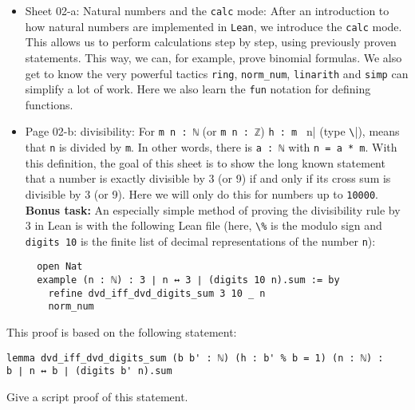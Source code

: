 \documentclass{memoir}
\begin{document}
\begin{itemize}
\item Sheet 02-a: Natural numbers and the \Verb|calc| mode:
    After an introduction to how natural numbers are implemented in \Verb|Lean|, we introduce the \Verb|calc| mode. This allows us to perform calculations step by step, using previously proven statements. This way, we can, for example, prove binomial formulas. We also get to know the very powerful tactics \Verb|ring|, \Verb|norm_num|, \Verb|linarith| and \Verb|simp| can simplify a lot of work. Here we also learn the \Verb|fun| notation for defining functions.\item Page 02-b: divisibility:
    For \Verb|m n : ℕ| (or \Verb|m n : ℤ|) \Verb|h : m | n| (type \Verb|\||), means that \Verb|n| is divided by \Verb|m|. In other words, there is \Verb|a : ℕ| with \Verb|n = a * m|. With this definition, the goal of this sheet is to show the long known statement that a number is exactly divisible by 3 (or 9) if and only if its cross sum is divisible by 3 (or 9). Here we will only do this for numbers up to \Verb|10000|.
\textbf{Bonus task:} An especially simple method of proving the divisibility rule by 3 in Lean is with the following Lean file (here, \Verb|\%| is the modulo sign and \Verb|digits 10| is the finite list of decimal representations of the
  number \Verb|n|):\begin{verbatim}
  open Nat
  example (n : ℕ) : 3 ∣ n ↔ 3 ∣ (digits 10 n).sum := by
    refine dvd_iff_dvd_digits_sum 3 10 _ n
    norm_num

\end{verbatim}

\end{itemize}


This proof is based on the following statement:

\begin{verbatim}
lemma dvd_iff_dvd_digits_sum (b b' : ℕ) (h : b' % b = 1) (n : ℕ) :
b ∣ n ↔ b ∣ (digits b' n).sum

\end{verbatim}


Give a script proof of this statement.
\end{document}
